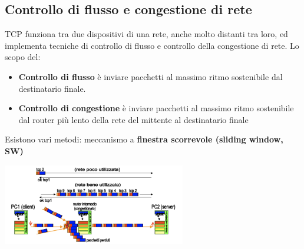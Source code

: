 \documentclass{article}
\begin{document}
\subsection{Controllo di flusso e congestione di rete}
TCP funziona tra due dispositivi di una rete, anche molto distanti tra loro, ed implementa tecniche di controllo di flusso e controllo della congestione di rete. Lo scopo del:
\begin{itemize}
    \item \textbf{Controllo di flusso} è inviare pacchetti al massimo ritmo sostenibile dal destinatario finale.
    \item \textbf{Controllo di congestione} è inviare pacchetti al massimo ritmo sostenibile dal router più lento della rete del mittente al destinatario finale
\end{itemize}
Esistono vari metodi: meccanismo a \textbf{finestra scorrevole (sliding window, SW)}
\begin{center}
    \includegraphics[width=8cm]{img/congestione.png}
\end{center}
\end{document}

